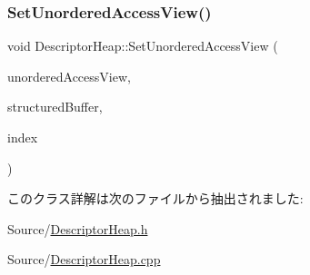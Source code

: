 \subsubsection{\texorpdfstring{Set\+Unordered\+Access\+View()}{SetUnorderedAccessView()}}
{\footnotesize\ttfamily void Descriptor\+Heap\+::\+Set\+Unordered\+Access\+View (\begin{DoxyParamCaption}\item[{const D3\+D12\+\_\+\+U\+N\+O\+R\+D\+E\+R\+E\+D\+\_\+\+A\+C\+C\+E\+S\+S\+\_\+\+V\+I\+E\+W\+\_\+\+D\+E\+SC \&}]{unordered\+Access\+View,  }\item[{Com\+Ptr$<$ I\+D3\+D12\+Resource $>$}]{structured\+Buffer,  }\item[{U\+I\+NT}]{index }\end{DoxyParamCaption})}



このクラス詳解は次のファイルから抽出されました\+:\begin{DoxyCompactItemize}
\item 
Source/\mbox{\hyperlink{_descriptor_heap_8h}{Descriptor\+Heap.\+h}}\item 
Source/\mbox{\hyperlink{_descriptor_heap_8cpp}{Descriptor\+Heap.\+cpp}}\end{DoxyCompactItemize}
